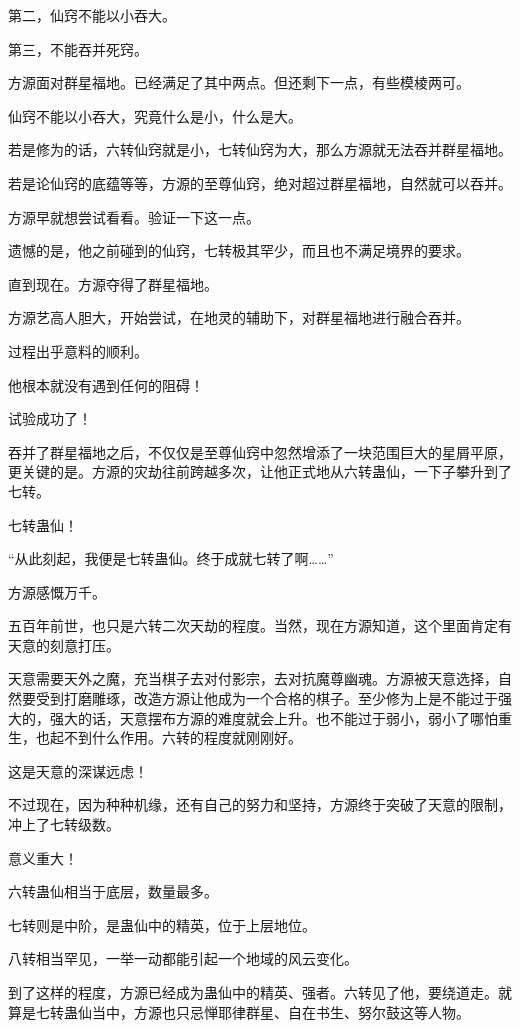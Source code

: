 \begin{this_body}
第二，仙窍不能以小吞大。

第三，不能吞并死窍。

方源面对群星福地。已经满足了其中两点。但还剩下一点，有些模棱两可。

仙窍不能以小吞大，究竟什么是小，什么是大。

若是修为的话，六转仙窍就是小，七转仙窍为大，那么方源就无法吞并群星福地。

若是论仙窍的底蕴等等，方源的至尊仙窍，绝对超过群星福地，自然就可以吞并。

方源早就想尝试看看。验证一下这一点。

遗憾的是，他之前碰到的仙窍，七转极其罕少，而且也不满足境界的要求。

直到现在。方源夺得了群星福地。

方源艺高人胆大，开始尝试，在地灵的辅助下，对群星福地进行融合吞并。

过程出乎意料的顺利。

他根本就没有遇到任何的阻碍！

试验成功了！

吞并了群星福地之后，不仅仅是至尊仙窍中忽然增添了一块范围巨大的星屑平原，更关键的是。方源的灾劫往前跨越多次，让他正式地从六转蛊仙，一下子攀升到了七转。

七转蛊仙！

“从此刻起，我便是七转蛊仙。终于成就七转了啊……”

方源感慨万千。

五百年前世，也只是六转二次天劫的程度。当然，现在方源知道，这个里面肯定有天意的刻意打压。

天意需要天外之魔，充当棋子去对付影宗，去对抗魔尊幽魂。方源被天意选择，自然要受到打磨雕琢，改造方源让他成为一个合格的棋子。至少修为上是不能过于强大的，强大的话，天意摆布方源的难度就会上升。也不能过于弱小，弱小了哪怕重生，也起不到什么作用。六转的程度就刚刚好。

这是天意的深谋远虑！

不过现在，因为种种机缘，还有自己的努力和坚持，方源终于突破了天意的限制，冲上了七转级数。

意义重大！

六转蛊仙相当于底层，数量最多。

七转则是中阶，是蛊仙中的精英，位于上层地位。

八转相当罕见，一举一动都能引起一个地域的风云变化。

到了这样的程度，方源已经成为蛊仙中的精英、强者。六转见了他，要绕道走。就算是七转蛊仙当中，方源也只忌惮耶律群星、自在书生、努尔鼓这等人物。


\end{this_body}
